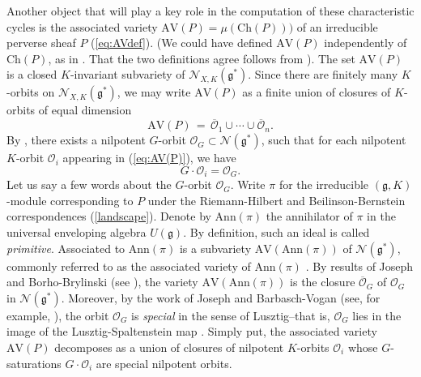 \documentclass[a4paper, 11pt]{article}
\begin{document}
Another object that will play a key role in the computation of these
characteristic cycles is the associated variety $\mathrm{AV}(P) =
\mu(\mathrm{Ch}(P)))$  of an
irreducible perverse sheaf $P$ (\ref{eq:AVdef}). (We could have
defined $\mathrm{AV}(P)$ independently of $\mathrm{Ch}(P)$, as in 
\cite{Vogan-Avariety}. That the two definitions agree follows from
\cite[Theorem 1.9(c)]{BoBrIII}). 
The set $\mathrm{AV}(P)$ is a closed 
$K$-invariant subvariety of $\mathcal{N}_{X,K}(\mathfrak{g}^\ast)$.
Since there are finitely many $K$-orbits on
$\mathcal{N}_{X,K}(\mathfrak{g}^\ast)$, we may write  $\mathrm{AV}(P)$
as a finite union of closures of $K$-orbits of equal dimension
\begin{equation}\label{eq:AV(P)}
\mathrm{AV}(P)\, =\, \overline{\mathcal{O}}_1 \cup \cdots \cup
\overline{\mathcal{O}}_n. 
\end{equation}
By \cite[Theorem 8.4]{Vogan-Avariety}, 
there exists a nilpotent $G$-orbit $\mathcal{O}_{G} \subset
\mathcal{N}(\mathfrak{g}^\ast)$, such that 
for each nilpotent $K$-orbit $\mathcal{O}_i$ appearing in 
(\ref{eq:AV(P)}), we have 
$$G\cdot \mathcal{O}_i=\mathcal{O}_{G}.$$
Let us say a few words about the \( G \)-orbit \( \mathcal{O}_{G} \).
Write $\pi$ for the irreducible $(\mathfrak{g}, K)$-module
corresponding to  $P$
under the Riemann-Hilbert and Beilinson-Bernstein
correspondences (\ref{landscape}).   Denote by $\mathrm{Ann}(\pi)$ the
annihilator of  
$\pi$ in  the universal enveloping algebra $U(\mathfrak{g})$.
By definition, such an  ideal is called \emph{primitive}. 
Associated to $\mathrm{Ann}(\pi)$ is a subvariety
$\mathrm{AV}(\mathrm{Ann}(\pi))$ of 
$\mathcal{N}(\mathfrak{g}^\ast)$, commonly referred to as the
associated variety of $\mathrm{Ann}(\pi)$ \cite[(1.4)]{Vogan-Avariety}.  By
results of Joseph and 
Borho-Brylinski (see \cite[{Theorem 10.2.2}]{Collingwood-McGovern}),
the variety $\mathrm{AV}(\mathrm{Ann}(\pi))$ is the closure
$\overline{\mathcal{O}}_{G}$ of %
$\mathcal{O}_{G}$ in $\mathcal{N}(\mathfrak{g}^\ast)$. Moreover, by the
work of Joseph and Barbasch-Vogan (see, for example, \cite[{Theorem
    10.3.2}]{Collingwood-McGovern}), the orbit $\mathcal{O}_{G}$ is
\emph{special} in the sense of Lusztig--that is, $\mathcal{O}_{G}$ lies in
the image of the Lusztig-Spaltenstein map \cite{Spaltenstein}.  
Simply put, the 
associated variety \( \mathrm{AV}(P) \) decomposes as a union of
closures of nilpotent \( K \)-orbits \( \mathcal{O}_{i} \) whose \( G
\)-saturations \( G \cdot \mathcal{O}_{i} \) are special nilpotent orbits.
\end{document}
